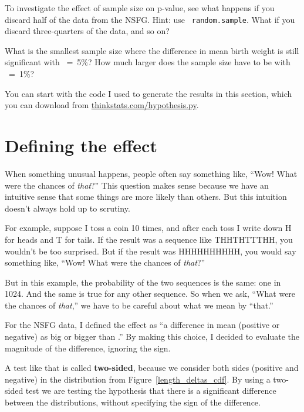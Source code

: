 \documentclass[12pt]{book}
\begin{document}
\begin{exercise}
To investigate the effect of sample size on p-value, see what happens
if you discard half of the data from the NSFG.  Hint: use {\tt
  random.sample}.  What if you discard three-quarters of the data, and
so on?

What is the smallest sample size where the difference in mean birth
weight is still significant with \myalpha~=~5\%?  How much
larger does the sample size have to be with \myalpha~=~1\%?

You can start with the code I used to generate the results in this
section, which you can download from \url{thinkstats.com/hypothesis.py}.

\end{exercise}


\section{Defining the effect}

When something unusual happens, people often say something like,
``Wow!  What were the chances of {\em that}?''  This question makes
sense because we have an intuitive sense that some things are more
likely than others.  But this intuition doesn't always hold up to
scrutiny.

For example, suppose I toss a coin 10 times, and after each toss I
write down H for heads and T for tails.  If the result was a sequence
like THHTHTTTHH, you wouldn't be too surprised.  But if the result was
HHHHHHHHHH, you would say something like, ``Wow!  What were the
chances of {\em that}?''

But in this example, the probability of the two sequences is the
same: one in 1024.  And the same is true for any other sequence.
So when we ask, ``What were the chances of {\em that},'' we have
to be careful about what we mean by ``that.''

For the NSFG data, I defined the effect as ``a difference in mean
(positive or negative) as big or bigger than \mydelta.''  By making
this choice, I decided to evaluate the magnitude of the difference,
ignoring the sign.

A test like that is called {\bf two-sided}, because we consider both
sides (positive and negative) in the distribution from
Figure~\ref{length_deltas_cdf}.  By using a two-sided test we are
testing the hypothesis that there is a significant difference between
the distributions, without specifying the sign of the difference.
\end{document}
